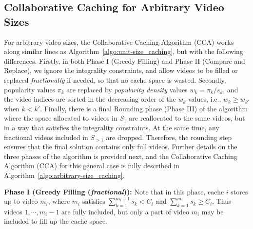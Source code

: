 \documentclass[conference]{IEEEtran}
\begin{document}
\subsection{Collaborative Caching for Arbitrary Video Sizes}
For arbitrary video sizes, the Collaborative Caching Algorithm (CCA) works along similar lines as Algorithm~\ref{algo:unit-size_caching}, but with the following differences. Firstly, in both Phase I (Greedy Filling) and Phase II (Compare and Replace), we ignore the integrality constraints, and allow videos to be filled or replaced \textit{fractionally} if needed, so that no cache space is wasted. Secondly, popularity values $\pi_k$ are replaced by \textit{popularity density} values $w_k = \pi_k/s_k$, and the video indices are sorted in the decreasing order of the $w_k$ values, i.e., $w_k \geq w_{k'}$ when $k < k'$. Finally, there is a final Rounding phase (Phase III) of the algorithm where the space allocated to videos in $S_1$ are reallocated to the same videos, but in a way that satisfies the integrality constraints. At the same time, any fractional videos included in $S_{>1}$ are dropped. Therefore, the rounding step ensures that the final solution contains only full videos. Further details on the three phases of the algorithm is provided next, and
the Collaborative Caching Algorithm (CCA) for this general case is fully described in Algorithm~\ref{algo:arbitrary-size_caching}. 

\noindent \textbf{Phase I (Greedy Filling (\textit{fractional})):} Note that in this phase, cache $i$ stores up to video $m_i$, where $m_i$ satisfies $\sum_{k=1}^{m_i-1} s_k < C_i$ and $\sum_{k=1}^{m_i} s_k \geq C_i$. Thus videos $1, \cdots, m_i-1$ are fully included, but only a part of video $m_i$ may be included to fill up the cache space.

\end{document}
